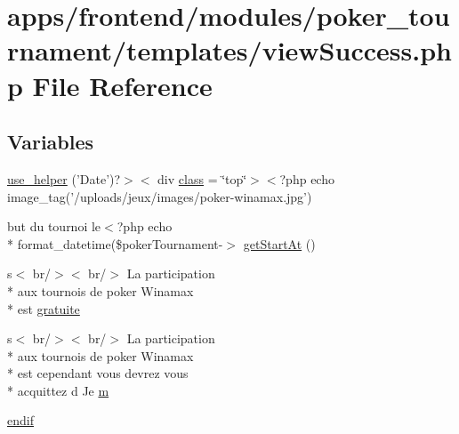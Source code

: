\hypertarget{frontend_2modules_2poker__tournament_2templates_2view_success_8php}{\section{apps/frontend/modules/poker\-\_\-tournament/templates/view\-Success.php File Reference}
\label{frontend_2modules_2poker__tournament_2templates_2view_success_8php}
}
\subsection*{Variables}
\begin{DoxyCompactItemize}
\item 
\hyperlink{frontend_2modules_2poker__tournament_2templates_2view_success_8php_af7021ad5f4c3d81ef96691bf68712c7a}{use\-\_\-helper} ('Date')?$>$$<$ div \hyperlink{live_2modules_2news_2templates_2__actualitelight_8php_a185c73c6507391d1eb38c776b68ce96d}{class} = \char`\"{}top\char`\"{}$>$$<$?php echo image\-\_\-tag('/uploads/jeux/images/poker-\/winamax.\-jpg')
\item 
but du tournoi le$<$?php echo \\*
format\-\_\-datetime(\$poker\-Tournament-\/$>$ \hyperlink{frontend_2modules_2poker__tournament_2templates_2view_success_8php_a5f452ee7b2538533f42d528a3d9204bf}{get\-Start\-At} ()
\item 
s$<$ br/$>$$<$ br/$>$ La participation \\*
aux tournois de poker Winamax \\*
est \hyperlink{frontend_2modules_2poker__tournament_2templates_2view_success_8php_a1b18a7afda7e749916f8bb1f57a0f24b}{gratuite}
\item 
s$<$ br/$>$$<$ br/$>$ La participation \\*
aux tournois de poker Winamax \\*
est cependant vous devrez vous \\*
acquittez d Je \hyperlink{frontend_2modules_2poker__tournament_2templates_2view_success_8php_a128ba33893be6a113de6d7895ff5d641}{m}
\item 
\hyperlink{frontend_2modules_2poker__tournament_2templates_2view_success_8php_a82cd33ca97ff99f2fcc5e9c81d65251b}{endif}
\end{DoxyCompactItemize}


